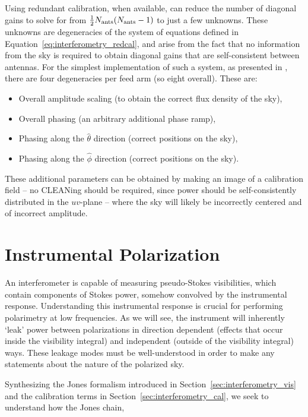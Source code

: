 Using redundant calibration, when available, can reduce the number of diagonal gains to solve for from $\frac{1}{2}N_{\rm ants}(N_{\rm ants} - 1)$ to just a few unknowns. These unknowns are degeneracies of the system of equations defined in Equation~\ref{eq:interferometry_redcal}, and arise from the fact that no information from the sky is required to obtain diagonal gains that are self-consistent between antennas. For the simplest implementation of such a system, as presented in \cite{Zheng.14}, there are four degeneracies per feed arm (so eight overall). These are:

\begin{itemize}
\item Overall amplitude scaling (to obtain the correct flux density of the sky),
\item Overall phasing (an arbitrary additional phase ramp),
\item Phasing along the $\hat{\theta}$ direction (correct positions on the sky),
\item Phasing along the $\hat{\phi}$ direction (correct positions on the sky).
\end{itemize}

These additional parameters can be obtained by making an image of a calibration field -- no CLEANing should be required, since power should be self-consistently distributed in the $uv$-plane -- where the sky will likely be incorrectly centered and of incorrect amplitude.

\section{Instrumental Polarization}
\label{sec:interferometry_pol}

An interferometer is capable of measuring pseudo-Stokes visibilities, which contain components of Stokes power, somehow convolved by the instrumental response. Understanding this instrumental response is crucial for performing polarimetry at low frequencies. As we will see, the instrument will inherently `leak' power between polarizations in direction dependent (effects that occur inside the visibility integral) and independent (outside of the visibility integral) ways. These leakage modes must be well-understood in order to make any statements about the nature of the polarized sky.

Synthesizing the Jones formalism introduced in Section~\ref{sec:interferometry_vis} and the calibration terms in Section~\ref{sec:interferometry_cal}, we seek to understand how the Jones chain,

